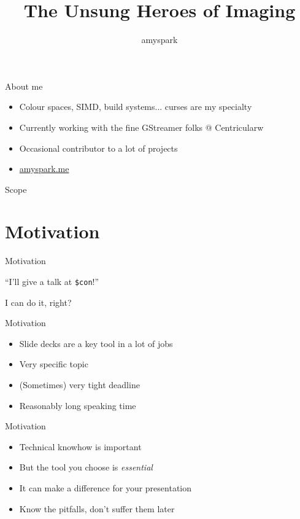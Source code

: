 \documentclass[aspectratio=169]{fireshonks}
\title{The Unsung Heroes of Imaging}
\author{amyspark}
\date{\DTMdate{2023-12-27}}
\begin{document}
\maketitle

\begin{frame}{About me}
  \begin{itemize}[<*>]
    \item Colour spaces, SIMD, build systems... curses are my specialty 
    \item Currently working with the fine GStreamer folks @ Centricularw
    \item Occasional contributor to a lot of projects
    \item \href{https://www.amyspark.me}{amyspark.me}
  \end{itemize}
\end{frame}
\begin{frame}{Scope}
  \tableofcontents
\end{frame}
\section{Motivation}
\begin{frame}{Motivation}
  \begin{center}
    \enquote{I'll give a talk at \texttt{\$con}!}

    I can do it, right?
  \end{center}
\end{frame}
\begin{frame}{Motivation}
  \begin{itemize}
    \item Slide decks are a key tool in a lot of jobs
    \item Very specific topic
    \item (Sometimes) very tight deadline
    \item Reasonably long speaking time
  \end{itemize}
\end{frame}
\begin{frame}
  \begin{center}
  \end{center}
\end{frame}
\begin{frame}{Motivation}
  \begin{itemize}
    \item Technical knowhow is important
    \item But the tool you choose is \emph{essential}
    \item It can make a difference for your presentation
    \item Know the pitfalls, don't suffer them later
  \end{itemize}
\end{frame}
\end{document}
